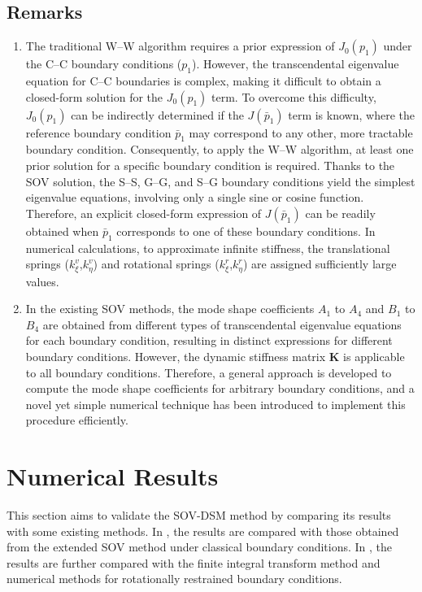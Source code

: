 \documentclass[preprint,12pt,number]{elsarticle}
\begin{document}
\subsection{Remarks}
\begin{enumerate}[label=(\roman*)]
	\item The traditional W–W algorithm requires a prior expression of $J_0(p_1)$ under the C–C boundary conditions ($p_1$).  
	However, the transcendental eigenvalue equation for C–C boundaries is complex, making it difficult to obtain a closed-form solution for the $J_0(p_1)$ term.  
	To overcome this difficulty, $J_0(p_1)$ can be indirectly determined if the $J(\bar{p}_1)$ term is known,  
	where the reference boundary condition $\bar{p}_1$ may correspond to any other, more tractable boundary condition.  
	Consequently, to apply the W–W algorithm, at least one prior solution for a specific boundary condition is required.  	
	Thanks to the SOV solution, the S–S, G–G, and S–G boundary conditions yield the simplest eigenvalue equations, involving only a single sine or cosine function.  
	Therefore, an explicit closed-form expression of $J(\bar{p}_1)$ can be readily obtained when $\bar{p}_1$ corresponds to one of these boundary conditions.  	
	In numerical calculations, to approximate infinite stiffness, the translational springs ($k^{v}_{\xi}$,$k^{v}_{\eta}$) and rotational springs ($k^{r}_{\xi}$,$k^{r}_{\eta}$) are assigned sufficiently large values.
	
	\item In the existing SOV methods, the mode shape coefficients $A_1$ to $A_4$ and $B_1$ to $B_4$ are obtained from different types of transcendental eigenvalue equations for each boundary condition, resulting in distinct expressions for different boundary conditions.  
	However, the dynamic stiffness matrix $\mathbf{K}$ is applicable to all boundary conditions.  
	Therefore, a general approach is developed to compute the mode shape coefficients for arbitrary boundary conditions,  
	and a novel yet simple numerical technique has been introduced to implement this procedure efficiently.
	
	
\end{enumerate}


\FloatBarrier
\section{Numerical Results}\label{sec:NR}  
This section aims to validate the SOV-DSM method by comparing its results with some existing methods.  
In , the results are compared with those obtained from the extended SOV method under classical boundary conditions.  
In , the results are further compared with the finite integral transform method and numerical methods for rotationally restrained boundary conditions.
\end{document}
